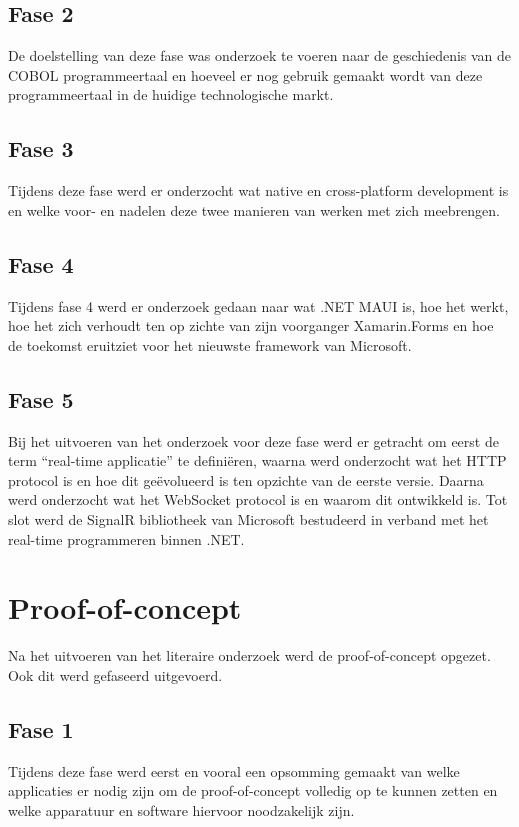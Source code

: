 \subsection{Fase 2}
De doelstelling van deze fase was onderzoek te voeren naar de geschiedenis van de COBOL programmeertaal en hoeveel er nog gebruik gemaakt wordt van deze programmeertaal in de huidige technologische markt.

\subsection{Fase 3}
Tijdens deze fase werd er onderzocht wat native en cross-platform development is en welke voor- en nadelen deze twee manieren van werken met zich meebrengen.

\subsection{Fase 4}
Tijdens fase 4 werd er onderzoek gedaan naar wat .NET MAUI is, hoe het werkt, hoe het zich verhoudt ten op zichte van zijn voorganger Xamarin.Forms en hoe de toekomst eruitziet voor het nieuwste framework van Microsoft.

\subsection{Fase 5}
Bij het uitvoeren van het onderzoek voor deze fase werd er getracht om eerst de term ``real-time applicatie'' te definiëren, waarna werd onderzocht wat het HTTP protocol is en hoe dit geëvolueerd is ten opzichte van de eerste versie. Daarna werd onderzocht wat het WebSocket protocol is en waarom dit ontwikkeld is. Tot slot werd de SignalR bibliotheek van Microsoft bestudeerd in verband met het real-time programmeren binnen .NET.

\section{Proof-of-concept}
Na het uitvoeren van het literaire onderzoek werd de proof-of-concept opgezet. Ook dit werd gefaseerd uitgevoerd.

\subsection{Fase 1}
Tijdens deze fase werd eerst en vooral een opsomming gemaakt van welke applicaties er nodig zijn om de proof-of-concept volledig op te kunnen zetten en welke apparatuur en software hiervoor noodzakelijk zijn.

